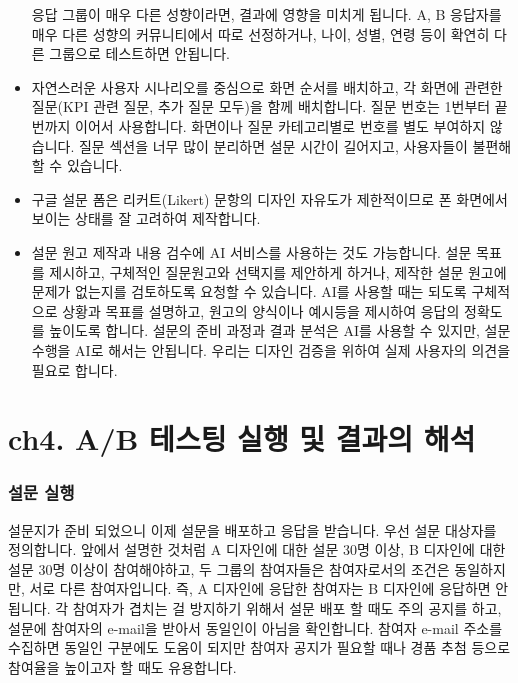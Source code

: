 \documentclass[
  letterpaper,
]{book}
\begin{document}
\begin{itemize}
  응답 그룹이 매우 다른 성향이라면, 결과에 영향을 미치게 됩니다. A, B
  응답자를 매우 다른 성향의 커뮤니티에서 따로 선정하거나, 나이, 성별,
  연령 등이 확연히 다른 그룹으로 테스트하면 안됩니다.
\item
  자연스러운 사용자 시나리오를 중심으로 화면 순서를 배치하고, 각 화면에
  관련한 질문(KPI 관련 질문, 추가 질문 모두)을 함께 배치합니다. 질문
  번호는 1번부터 끝번까지 이어서 사용합니다. 화면이나 질문 카테고리별로
  번호를 별도 부여하지 않습니다. 질문 섹션을 너무 많이 분리하면 설문
  시간이 길어지고, 사용자들이 불편해할 수 있습니다.
\item
  구글 설문 폼은 리커트(Likert) 문항의 디자인 자유도가 제한적이므로 폰
  화면에서 보이는 상태를 잘 고려하여 제작합니다.
\item
  설문 원고 제작과 내용 검수에 AI 서비스를 사용하는 것도 가능합니다.
  설문 목표를 제시하고, 구체적인 질문원고와 선택지를 제안하게 하거나,
  제작한 설문 원고에 문제가 없는지를 검토하도록 요청할 수 있습니다. AI를
  사용할 때는 되도록 구체적으로 상황과 목표를 설명하고, 원고의 양식이나
  예시등을 제시하여 응답의 정확도를 높이도록 합니다. 설문의 준비 과정과
  결과 분석은 AI를 사용할 수 있지만, 설문 수행을 AI로 해서는 안됩니다.
  우리는 디자인 검증을 위하여 실제 사용자의 의견을 필요로 합니다.
\end{itemize}

\chapter{ch4. A/B 테스팅 실행 및 결과의
해석}\label{ch4.-ab-uxd14cuxc2a4uxd305-uxc2e4uxd589-uxbc0f-uxacb0uxacfcuxc758-uxd574uxc11d}

\subsection{설문 실행}\label{uxc124uxbb38-uxc2e4uxd589}

설문지가 준비 되었으니 이제 설문을 배포하고 응답을 받습니다. 우선 설문
대상자를 정의합니다. 앞에서 설명한 것처럼 A 디자인에 대한 설문 30명
이상, B 디자인에 대한 설문 30명 이상이 참여해야하고, 두 그룹의
참여자들은 참여자로서의 조건은 동일하지만, 서로 다른 참여자입니다. 즉, A
디자인에 응답한 참여자는 B 디자인에 응답하면 안됩니다. 각 참여자가
겹치는 걸 방지하기 위해서 설문 배포 할 때도 주의 공지를 하고, 설문에
참여자의 e-mail을 받아서 동일인이 아님을 확인합니다. 참여자 e-mail
주소를 수집하면 동일인 구분에도 도움이 되지만 참여자 공지가 필요할 때나
경품 추첨 등으로 참여율을 높이고자 할 때도 유용합니다.
\end{document}
